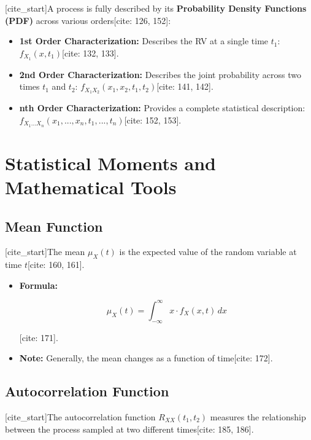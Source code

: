 \documentclass{article}
\begin{document}
[cite\_start]A process is fully described by its \textbf{Probability Density Functions (PDF)} across various orders[cite: 126, 152]:

\begin{itemize}

\item [cite\_start]\textbf{1st Order Characterization:} Describes the RV at a single time $t_1$: $f_{X_1}(x, t_1)$[cite: 132, 133].

\item [cite\_start]\textbf{2nd Order Characterization:} Describes the joint probability across two times $t_1$ and $t_2$: $f_{X_1X_2}(x_1, x_2, t_1, t_2)$[cite: 141, 142].

\item [cite\_start]\textbf{nth Order Characterization:} Provides a complete statistical description: $f_{X_1...X_n}(x_1, ..., x_n, t_1, ..., t_n)$[cite: 152, 153].

\end{itemize}

\section{Statistical Moments and Mathematical Tools}

\subsection{Mean Function}

[cite\_start]The mean $\mu_X(t)$ is the expected value of the random variable at time $t$[cite: 160, 161].

\begin{itemize}

\item [cite\_start]\textbf{Formula:}

\[
\mu_X(t) = \int_{-\infty}^{\infty} x \cdot f_X(x, t)\, dx
\]

[cite: 171].

\item [cite\_start]\textbf{Note:} Generally, the mean changes as a function of time[cite: 172].

\end{itemize}

\subsection{Autocorrelation Function}

[cite\_start]The autocorrelation function $R_{XX}(t_1, t_2)$ measures the relationship between the process sampled at two different times[cite: 185, 186].
\end{document}
